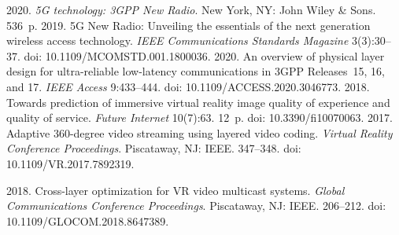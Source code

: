   \begin{multicols}{2}

\renewcommand{\bibname}{\protect\rmfamily References}

{\small\frenchspacing
 {%
 \begin{thebibliography}{99}
   2020. \textit{5G technology: 3GPP New 
Radio}. New York, NY:  John Wiley \& Sons. 536~p.
   2019. 5G New Radio: Unveiling 
the essentials of the next generation wireless access technology. \textit{IEEE Communications 
Standards Magazine} 3(3):30--37. doi: 10.1109/MCOMSTD.001.1800036.
   2020. An overview of physical layer design 
for ultra-reliable low-latency communications in 3GPP Releases~15, 16, and 17. \textit{IEEE 
Access} 9:433--444. doi: 10.1109/ACCESS.2020.3046773.
   2018. Towards prediction of immersive 
virtual reality image quality of experience and quality of service. \textit{Future Internet} 10(7):63. 
12~p. doi: 10.3390/fi10070063.
   2017. Adaptive  
360-degree video streaming using layered video coding. \textit{Virtual Reality Conference 
Proceedings}. Piscataway, NJ:  IEEE. 347--348. doi: 10.1109/VR.2017.7892319.

   2018. Cross-layer optimization for VR video multicast 
systems. \textit{Global Communications Conference Proceedings}.  Piscataway, NJ: IEEE. 206--212. doi: 
10.1109/GLOCOM.2018.8647389.


\end{thebibliography}}}
\end{multicols}
